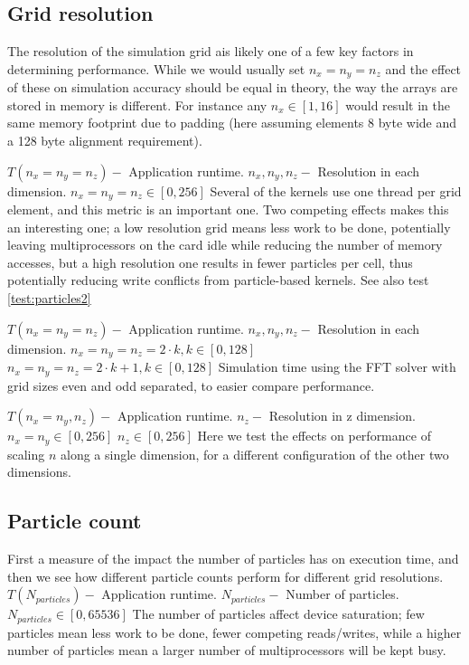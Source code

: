 \subsection{Grid resolution}
The resolution of the simulation grid ais likely one of a few key factors in determining performance. While we would
usually set $n_x = n_y = n_z$ and the effect of these on simulation accuracy should be equal in theory, the way the
arrays are stored in memory is different. For instance any $n_x \in [1,16]$ would result in the same memory footprint
due to padding (here assuming elements 8 byte wide and a 128 byte alignment requirement).

	{$T(n_x = n_y = n_z) -$ Application runtime.}
	{$n_x, n_y, n_z -$ Resolution in each dimension.}
	{$n_x = n_y = n_z \in [0,256]$}
	{Several of the kernels use one thread per grid element, and this metric is an important one. Two competing effects
	makes this an interesting one; a low resolution grid means less work to be done, potentially leaving multiprocessors on the
	card idle while reducing the number of memory accesses, but a high resolution one results in fewer particles per cell,
	thus potentially reducing write conflicts from particle-based kernels. See also test \ref{test:particles2}}

	{$T(n_x = n_y = n_z) -$ Application runtime.}
	{$n_x, n_y, n_z -$ Resolution in each dimension.}
	{$n_x = n_y = n_z = 2\cdot k, k \in [0,128]$
	$n_x = n_y = n_z = 2\cdot k+1, k \in [0,128]$}
	{Simulation time using the FFT solver with grid sizes even and odd separated, to easier compare performance.}
	
	{$T(n_x = n_y, n_z) -$ Application runtime.}
	{$n_z -$ Resolution in z dimension.}
	{$n_x = n_y \in [0, 256]$\newline
	 $n_z \in [0, 256]$}
	{Here we test the effects on performance of scaling $n$ along a single dimension, for a different configuration of the
	other two dimensions.}

\subsection{Particle count}
First a measure of the impact the number of particles has on execution time, and then we see how different particle
counts perform for different grid resolutions.
	{$T(N_{particles}) -$ Application runtime.}
	{$N_{particles} -$ Number of particles.}
	{$N_{particles} \in [0, 65536]$}
	{The number of particles affect device saturation; few particles mean less work to be done, fewer competing reads/writes,
	  while a higher number of particles mean a larger number of multiprocessors will be kept busy.}

